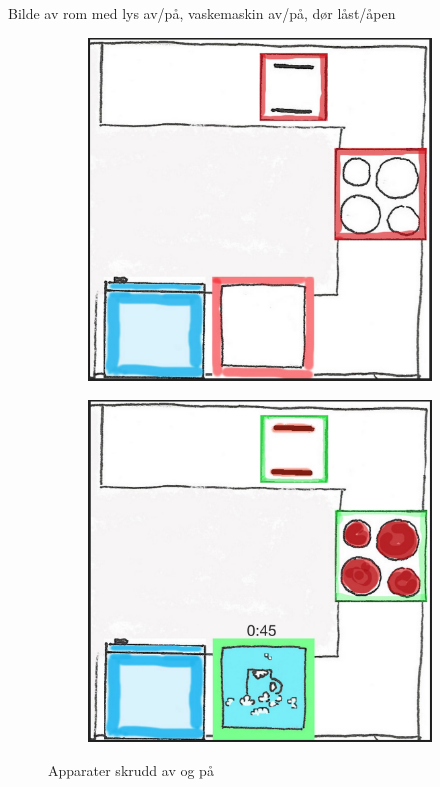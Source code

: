 {\color{red}Bilde av rom med lys av/på, vaskemaskin av/på, dør låst/åpen}

\begin{figure}[ht]
\centering
\begin{subfigure}{0.32\textwidth}
\centering
\includegraphics[scale=0.1]{fig/kitchen}
\caption{}
\label{fig:kitchenon}
\end{subfigure}
\begin{subfigure}{0.32\textwidth}
\centering
\includegraphics[scale=0.1]{fig/kitchen2}
\caption{}
\label{fig:kitchenoff}
\end{subfigure}
\caption{Apparater skrudd av og på}
\label{fig:kitchenonoff}
\end{figure}

